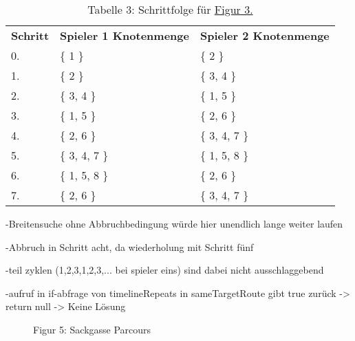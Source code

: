 \documentclass[a4paper,10pt,ngerman]{scrartcl}
\begin{document}
    \begin{table}[h!]
        \centering
        \begin{tabular}{lll}
            \textbf{Schritt} & \textbf{Spieler 1 Knotenmenge} & \textbf{Spieler 2 Knotenmenge} \\
            0.               & \{ 1 \}                        & \{ 2 \}                        \\
            1.               & \{ 2 \}                        & \{ 3, 4 \}                     \\
            2.               & \{ 3, 4 \}                     & \{ 1, 5 \}                     \\
            3.               & \{ 1, 5 \}                     & \{ 2, 6 \}                     \\
            4.               & \{ 2, 6 \}                     & \{ 3, 4, 7 \}                  \\
            5.               & \{ 3, 4, 7 \}                  & \{ 1, 5, 8 \}                  \\
            6.               & \{ 1, 5, 8 \}                  & \{ 2, 6 \}                     \\
            7.               & \{ 2, 6 \}                     & \{ 3, 4, 7 \}                  \\
        \end{tabular}
        \caption{Tabelle 3: Schrittfolge für \hyperref[fig:Figure4]{Figur 3.}}
        \label{tab:Table3}
    \end{table}

    -Breitensuche ohne Abbruchbedingung würde hier unendlich lange weiter laufen

    -Abbruch in Schritt acht, da wiederholung mit Schritt fünf

    -teil zyklen (1,2,3,1,2,3,... bei spieler eins) sind dabei nicht ausschlaggebend

    -aufruf in if-abfrage von timelineRepeats in sameTargetRoute gibt true zurück
    -> return null -> Keine Lösung




    \begin{figure}[h!]
        \centering
        \FigurFuenf{}
        \caption{Figur 5: Sackgasse Parcours}
        \label{fig:Figure5}
    \end{figure}
\end{document}
